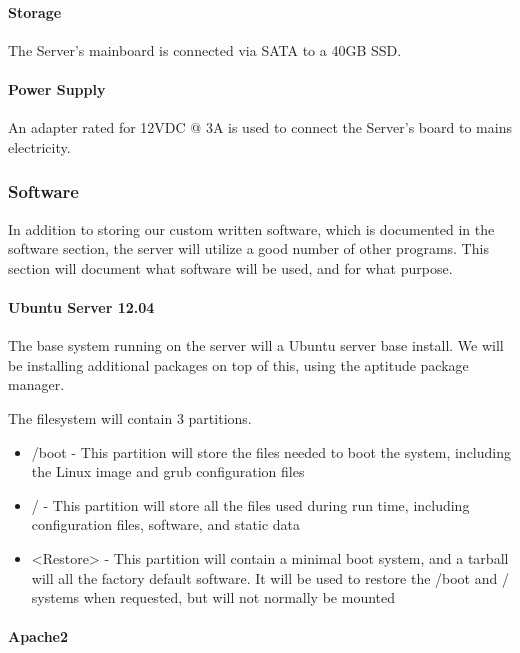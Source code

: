 \paragraph{Storage}
The Server's mainboard is connected via SATA to a 40GB SSD.

\paragraph{Power Supply}
An adapter rated for 12VDC @ 3A is used to connect the Server's board to mains electricity.

\subsubsection{Software}

In addition to storing our custom written software, which is documented in the software section, the server will utilize a good number of other programs. 
This section will document what software will be used, and for what purpose.

\paragraph{Ubuntu Server 12.04}

The base system running on the server will a Ubuntu server base install. 
We will be installing additional packages on top of this, using the aptitude package manager.

The filesystem will contain 3 partitions.

\begin{itemize}
 \item /boot - This partition will store the files needed to boot the system, including the Linux image and grub configuration files
 \item / - This partition will store all the files used during run time, including configuration files, software, and static data
 \item <Restore> - This partition will contain a minimal boot system, and a tarball will all the factory default software. It will be used to restore the /boot and / systems when requested, but will not normally be mounted
\end{itemize}

\paragraph{Apache2}

